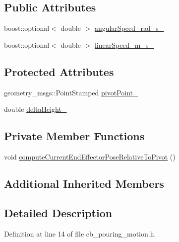 \subsection*{Public Attributes}
\begin{DoxyCompactItemize}
\item 
boost\+::optional$<$ double $>$ \hyperlink{classcl__move__group__interface_1_1CbCircularPouringMotion_a7f69b3f95281fc14902117d637b59972}{angular\+Speed\+\_\+rad\+\_\+s\+\_\+}
\item 
boost\+::optional$<$ double $>$ \hyperlink{classcl__move__group__interface_1_1CbCircularPouringMotion_ac78ce543451cbb78c95862dd4273deb7}{linear\+Speed\+\_\+m\+\_\+s\+\_\+}
\end{DoxyCompactItemize}
\subsection*{Protected Attributes}
\begin{DoxyCompactItemize}
\item 
geometry\+\_\+msgs\+::\+Point\+Stamped \hyperlink{classcl__move__group__interface_1_1CbCircularPouringMotion_a4c100d8ba3e57f7ddfb614017d115fca}{pivot\+Point\+\_\+}
\item 
double \hyperlink{classcl__move__group__interface_1_1CbCircularPouringMotion_a7009d617bcd8ac1fba49100444434f3c}{delta\+Height\+\_\+}
\end{DoxyCompactItemize}
\subsection*{Private Member Functions}
\begin{DoxyCompactItemize}
\item 
void \hyperlink{classcl__move__group__interface_1_1CbCircularPouringMotion_a4986b396e0ba318a0046feea3f6eede6}{compute\+Current\+End\+Effector\+Pose\+Relative\+To\+Pivot} ()
\end{DoxyCompactItemize}
\subsection*{Additional Inherited Members}


\subsection{Detailed Description}


Definition at line 14 of file cb\+\_\+pouring\+\_\+motion.\+h.



